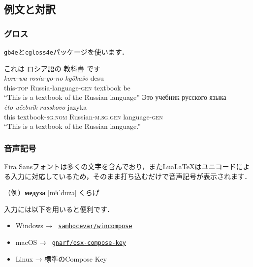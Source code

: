 \documentclass[12pt]{beamer}
\begin{document}
\subsection{例文と対訳}
\begin{frame}
\setlength{\glossglue}{5pt plus 2pt minus 1pt}\footnotesize
\frametitle{グロス}
\texttt{gb4e}と\texttt{cgloss4e}パッケージを使います．

\begin{exe}
    \ex%
    \glll%
    {これは} {ロシア語の} {教科書} {です} \\
    {\textit{kore-wa}} {\textit{rosia-go-no}} {\textit{kyōkašo}} {desu} \\
    {this-\textsc{top}} {Russia-language-\textsc{gen}} {textbook} {be} \\
    \trans%
    ``This is a textbook of the Russian language''
    \ex%
    \glll%
    {Это} {учебник} {русского} {языка} \\
    {\textit{èto}} {\textit{učebnik}} {\textit{russkovo}} {jazyka} \\
    {this} {textbook-\textsc{sg.nom}} {Russian-\textsc{m.sg.gen}} {language-\textsc{gen}} \\
    \trans%
    ``This is a textbook of the Russian language.''
\end{exe}
\end{frame}

\begin{frame}
    \frametitle{音声記号}
    Fira Sansフォントは多くの文字を含んでおり，またLua\LaTeX はユニコードによる入力に対応しているため，そのまま打ち込むだけで音声記号が表示されます．

    \smallskip

    （例）\textbf{медуза} [mʲɪˈduzə] くらげ

    \bigskip

    入力には以下を用いると便利です．
    \begin{itemize}
        \item Windows → \faGithub\ \href{https://github.com/samhocevar/wincompose}{\texttt{samhocevar/wincompose}}
        \item macOS → \faGithub\ \href{https://github.com/gnarf/osx-compose-key}{\texttt{gnarf/osx-compose-key}}
        \item Linux → 標準のCompose Key
    \end{itemize}
\end{frame}
\end{document}

